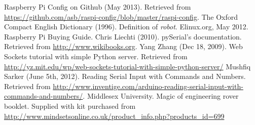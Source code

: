 \documentclass[]{report}   %
\begin{document}
	\begin{thebibliography}{9}
			 Raspberry Pi Config on Github (May 2013). Retrieved from \url{https://github.com/asb/raspi-config/blob/master/raspi-config}.
			 The Oxford Compact English Dictionary (1996). Definition of \emph{robot}.
			 Elinux.org, May 2012. Raspberry Pi Buying Guide.
			 Chris Liechti (2010). pySerial's documentation. Retrieved from \url{http://www.wikibooks.org}.
			 Yang Zhang (Dec 18, 2009). Web Sockets tutorial with simple Python server.
			Retrieved from \url{http://yz.mit.edu/wp/web-sockets-tutorial-with-simple-python-server/}
			 Mushfiq Sarker (June 5th, 2012). Reading Serial Input with Commands and Numbers. Retrieved from
			\url{http://www.inventige.com/arduino-reading-serial-input-with-commands-and-numbers/}.
			 Middlesex University. Magic of engineering rover booklet. Supplied with kit purchased from
			\url{http://www.mindsetsonline.co.uk/product_info.php?products_id=699}
	\end{thebibliography}
                      
        
\end{document}
